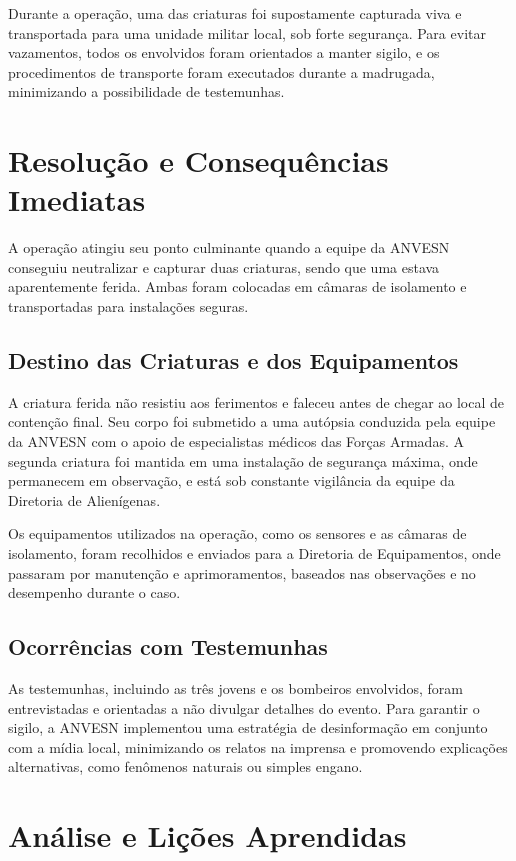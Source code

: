 Durante a operação, uma das criaturas foi supostamente capturada viva e transportada para uma unidade militar local, sob forte segurança. Para evitar vazamentos, todos os envolvidos foram orientados a manter sigilo, e os procedimentos de transporte foram executados durante a madrugada, minimizando a possibilidade de testemunhas.

\section{ Resolução e Consequências Imediatas}

A operação atingiu seu ponto culminante quando a equipe da ANVESN conseguiu neutralizar e capturar duas criaturas, sendo que uma estava aparentemente ferida. Ambas foram colocadas em câmaras de isolamento e transportadas para instalações seguras. 

\subsection{Destino das Criaturas e dos Equipamentos}
A criatura ferida não resistiu aos ferimentos e faleceu antes de chegar ao local de contenção final. Seu corpo foi submetido a uma autópsia conduzida pela equipe da ANVESN com o apoio de especialistas médicos das Forças Armadas. A segunda criatura foi mantida em uma instalação de segurança máxima, onde permanecem em observação, e está sob constante vigilância da equipe da Diretoria de Alienígenas.

Os equipamentos utilizados na operação, como os sensores e as câmaras de isolamento, foram recolhidos e enviados para a Diretoria de Equipamentos, onde passaram por manutenção e aprimoramentos, baseados nas observações e no desempenho durante o caso.

\subsection{Ocorrências com Testemunhas}
As testemunhas, incluindo as três jovens e os bombeiros envolvidos, foram entrevistadas e orientadas a não divulgar detalhes do evento. Para garantir o sigilo, a ANVESN implementou uma estratégia de desinformação em conjunto com a mídia local, minimizando os relatos na imprensa e promovendo explicações alternativas, como fenômenos naturais ou simples engano.

\section{ Análise e Lições Aprendidas}

